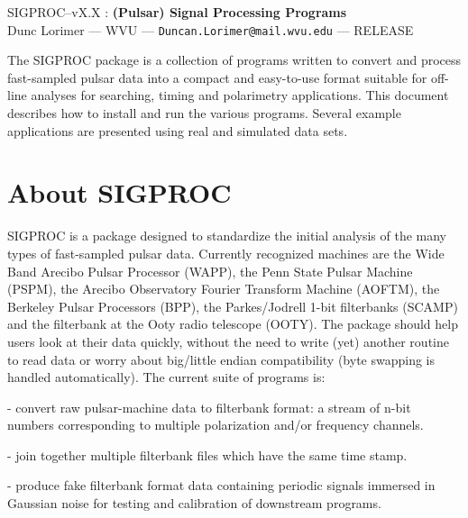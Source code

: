 \documentclass[11pt]{article}
\begin{document}
\begin{center}
{\LARGE {\sc SIGPROC--vX.X} : {\bf (Pulsar) Signal Processing Programs}}\\
\bigskip
\bigskip
{\large Dunc Lorimer --- WVU --- {\tt Duncan.Lorimer@mail.wvu.edu} --- RELEASE}
\end{center}
 The SIGPROC package is a collection of
programs written to convert and process fast-sampled pulsar data into
a compact and easy-to-use format suitable for off-line analyses for
searching, timing and polarimetry applications. This document
describes how to install and run the various programs. Several example
applications are presented using real and simulated data sets.
\tableofcontents

\clearpage
\section{About SIGPROC}

SIGPROC is a package designed to standardize the initial analysis of
the many types of fast-sampled pulsar data. Currently recognized
machines are the Wide Band Arecibo Pulsar Processor (WAPP), the Penn
State Pulsar Machine (PSPM), the Arecibo Observatory Fourier Transform
Machine (AOFTM), the Berkeley Pulsar Processors (BPP), the Parkes/Jodrell
1-bit filterbanks (SCAMP) and the
filterbank at the Ooty radio telescope (OOTY). The package
should help users look at their data quickly, without the need to
write (yet) another routine to read data or worry about big/little
  
endian compatibility (byte swapping is handled automatically).  The
current suite of programs is:

\bigskip
{} - convert raw pulsar-machine data to 
filterbank format: a stream of n-bit numbers corresponding to multiple
polarization and/or frequency channels. 

\smallskip
{} - join together multiple filterbank
files which have the same time stamp.

\smallskip
{} - produce fake filterbank format data
containing periodic signals immersed in Gaussian noise for
testing and calibration of downstream programs.
\end{document}
